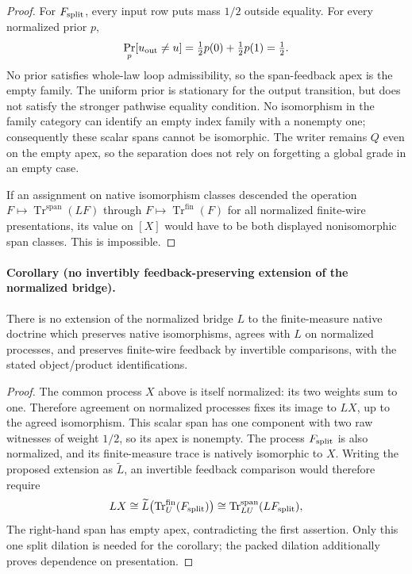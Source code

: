 \documentclass[11pt]{article}
\begin{document}
\begin{proof}
For $F_{\rm split}$, every input row puts mass $1/2$ outside equality. For every normalized prior $p$,
\[
 \Pr_p[u_{\rm out}\ne u]
 =\tfrac12p(0)+\tfrac12p(1)=\tfrac12.
\]
No prior satisfies whole-law loop admissibility, so the span-feedback apex is the empty family. The uniform prior is stationary for the output transition, but does not satisfy the stronger pathwise equality condition. No isomorphism in the family category can identify an empty index family with a nonempty one; consequently these scalar spans cannot be isomorphic. The writer remains $Q$ even on the empty apex, so the separation does not rely on forgetting a global grade in an empty case.

If an assignment on native isomorphism classes descended the operation $F\mapsto\operatorname{Tr}^{\mathrm{span}}(LF)$ through $F\mapsto\operatorname{Tr}^{\mathrm{fin}}(F)$ for all normalized finite-wire presentations, its value on $[X]$ would have to be both displayed nonisomorphic span classes. This is impossible.
\end{proof}

\paragraph{Corollary (no invertibly feedback-preserving extension of the normalized bridge).}
There is no extension of the normalized bridge $L$ to the finite-measure native doctrine which preserves native isomorphisms, agrees with $L$ on normalized processes, and preserves finite-wire feedback by invertible comparisons, with the stated object/product identifications.
\begin{proof}
The common process $X$ above is itself normalized: its two weights sum to one. Therefore agreement on normalized processes fixes its image to $LX$, up to the agreed isomorphism. This scalar span has one component with two raw witnesses of weight $1/2$, so its apex is nonempty. The process $F_{\rm split}$ is also normalized, and its finite-measure trace is natively isomorphic to $X$. Writing the proposed extension as $\widetilde L$, an invertible feedback comparison would therefore require
\[
 LX\cong \widetilde L\bigl(\operatorname{Tr}^{\mathrm{fin}}_U(F_{\rm split})\bigr)
 \cong\operatorname{Tr}^{\mathrm{span}}_{LU}(LF_{\rm split}),
\]
The right-hand span has empty apex, contradicting the first assertion. Only this one split dilation is needed for the corollary; the packed dilation additionally proves dependence on presentation.
\end{proof}
\end{document}
